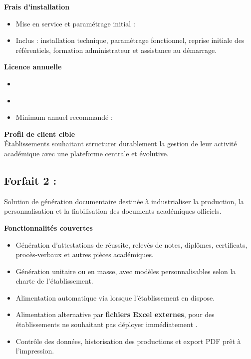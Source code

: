 \documentclass[12pt,a4paper]{article}
\newcommand{\Amount}[1]{#1~\Currency}
\newcommand{\FeatureListStart}{\begin{itemize}[leftmargin=1.2cm,itemsep=0.3em]}
\newcommand{\FeatureListEnd}{\end{itemize}}
\begin{document}
\textbf{Frais d'installation}
\FeatureListStart
    \item Mise en service et paramétrage initial : \Amount{\SetupAcademic}
    \item Inclus : installation technique, paramétrage fonctionnel, reprise initiale des référentiels, formation administrateur et assistance au démarrage.
\FeatureListEnd

\textbf{Licence annuelle}
\FeatureListStart
    \item \Amount{\AcademicStudentPrice}~\PricingPerStudentLabel
    \item \Amount{\AcademicUserPrice}~\PricingPerUserLabel
    \item Minimum annuel recommandé : \Amount{\AcademicMinimumAnnual}
\FeatureListEnd

\textbf{Profil de client cible}\\
Établissements souhaitant structurer durablement la gestion de leur activité académique avec une plateforme centrale et évolutive.

\subsection{Forfait 2 : \DocumentSoftwareName}

\begin{tcolorbox}[colback=SoftGreen,colframe=PrimaryBlue,title=Positionnement]
Solution de génération documentaire destinée à industrialiser la production, la personnalisation et la fiabilisation des documents académiques officiels.
\end{tcolorbox}

\textbf{Fonctionnalités couvertes}
\FeatureListStart
    \item Génération d'attestations de réussite, relevés de notes, diplômes, certificats, procès-verbaux et autres pièces académiques.
    \item Génération unitaire ou en masse, avec modèles personnalisables selon la charte de l'établissement.
    \item Alimentation automatique via \AcademicSoftwareName{} lorsque l'établissement en dispose.
    \item Alimentation alternative par \textbf{fichiers Excel externes}, pour des établissements ne souhaitant pas déployer immédiatement \AcademicSoftwareName.
    \item Contrôle des données, historisation des productions et export PDF prêt à l'impression.
\FeatureListEnd
\end{document}
